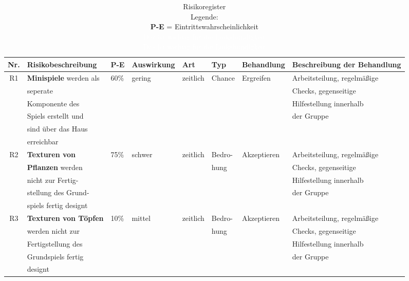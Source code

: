 \begin{table}[H]
    \footnotesize
    \caption[Risikoregister]{Risikoregister \\ Legende: \\
            \textbf{P-E} = Eintrittswahrscheinlichkeit \\
            \tiny\textcolor{white}{Das ist wichtig für die Linksbündigkeit}\\
            \textcolor{white}{Das ist wichtig für die Linksbündigkeit}\\
            }
    \label{tab:risk}
    \footnotesize
    \begin{tabular}{|c|l|l|l|l|l|l|l|}
        \hline
        Nr. & Risikobeschreibung & P-E & Auswirkung & Art & Typ & Behandlung & Beschreibung der Behandlung \\[0.5ex]
        \hline \hline
        R1 & \textbf{Minispiele} werden als & 60\% & gering & zeitlich & Chance & Ergreifen & Arbeitsteilung, regelmäßige\\
        & seperate &  &  &  &  && Checks, gegenseitige  \\
        & Komponente des &  &  & & &  & Hilfestellung innerhalb \\
        & Spiels erstellt und &  &&  &  &  & der Gruppe \\
        & sind über das Haus &  &  &  & & &  \\
        & erreichbar &  &  &  &  &&  \\
        \hline
        R2 & \textbf{Texturen von} & 75\% & schwer & zeitlich & Bedro- & Akzeptieren & Arbeitsteilung, regelmäßige \\
        & \textbf{Pflanzen} werden &  &&  & hung &  & Checks, gegenseitige  \\
        & nicht zur Fertig- &  &  &  & & & Hilfestellung innerhalb \\
        & stellung des Grund- &  &  &  &&  & der Gruppe \\
        & spiels fertig designt &  &  &  & & &  \\
        \hline
        R3 & \textbf{Texturen von Töpfen} & 10\% & mittel & zeitlich & Bedro- & Akzeptieren & Arbeitsteilung, regelmäßige \\
        & werden nicht zur &  &  &  &hung&  & Checks, gegenseitige \\
        & Fertigstellung des &  &  & & &  & Hilfestellung innerhalb \\
        & Grundspiels fertig &  &  &  &&  & der Gruppe \\
        & designt &  &  &  &  &&  \\

\end{tabular}
\end{table}

